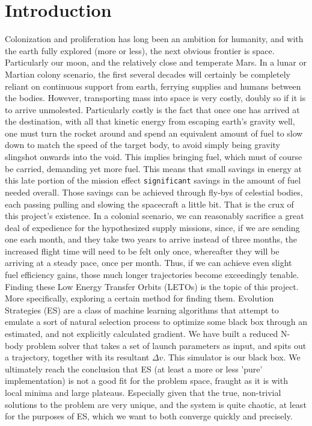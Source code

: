 
\chapter{Introduction}
Colonization and proliferation has long been an ambition for humanity, and with the earth fully explored (more or less), the next obvious frontier is space. Particularly our moon, and the relatively close and temperate Mars. In a lunar or Martian colony scenario, the first several decades will certainly be completely reliant on continuous support from earth, ferrying supplies and humans between the bodies. However, transporting mass into space is very costly, doubly so if it is to arrive unmolested. Particularly costly is the fact that once one has arrived at the destination, with all that kinetic energy from escaping earth's gravity well, one must turn the rocket around and spend an equivalent amount of fuel to slow down to match the speed of the target body, to avoid simply being gravity slingshot onwards into the void. This implies bringing fuel, which must of course be carried, demanding yet more fuel. This means that small savings in energy at this late portion of the mission effect \texttt{significant} savings in the amount of fuel needed overall. Those savings can be achieved through fly-bys of celestial bodies, each passing pulling and slowing the spacecraft a little bit. That is the crux of this project's existence. In a colonial scenario, we can reasonably sacrifice a great deal of expedience for the hypothesized supply missions, since, if we are sending one each month, and they take two years to arrive instead of three months, the increased flight time will need to be felt only once, whereafter they will be arriving at a steady pace, once per month. Thus, if we can achieve even slight fuel efficiency gains, those much longer trajectories become exceedingly tenable. Finding these Low Energy Transfer Orbits (LETOs) is the topic of this project. More specifically, exploring a certain method for finding them. Evolution Strategies (ES) are a class of machine learning algorithms that attempt to emulate a sort of natural selection process to optimize some black box through an estimated, and not explicitly calculated gradient. We have built a reduced N-body problem solver that takes a set of launch parameters as input, and spits out a trajectory, together with its resultant $\Delta v$. This simulator is our black box. We ultimately reach the conclusion that ES (at least a more or less 'pure' implementation) is not a good fit for the problem space, fraught as it is with local minima and large plateaus. Especially given that the true, non-trivial solutions to the problem are very unique, and the system is quite chaotic, at least for the purposes of ES, which we want to both converge quickly and precisely.

